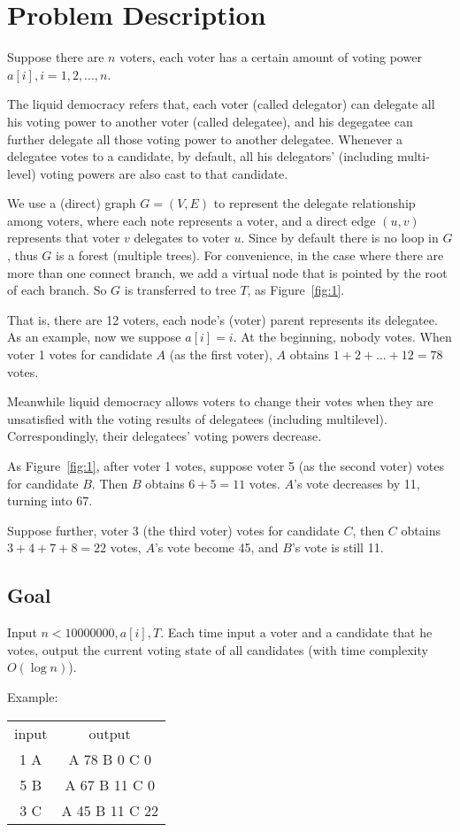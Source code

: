 \section{Problem Description}
Suppose there are $n$ voters, each voter has a certain amount of voting power $a[i],i=1,2,...,n$.

The liquid democracy refers that, each voter (called delegator) can delegate all his voting power to another voter (called delegatee), and his degegatee can further delegate all those voting power to another delegatee. Whenever a delegatee votes to a candidate, by default, all his delegators' (including multi-level) voting powers are also cast to that candidate.

We use a (direct) graph $G=(V,E)$ to represent the delegate relationship among
voters, where each note represents a voter, and a direct edge $(u,v)$
represents that voter $v$ delegates to voter $u$. Since by default there is no
loop in $G$, thus $G$ is a forest (multiple trees). For convenience, in the
case where there are more than one connect branch, we add a virtual node that
is pointed by the root of each branch. So $G$ is transferred to tree $T$, as
Figure~\ref{fig:1}.

That is, there are 12 voters, each node's  (voter) parent represents its
delegatee. As an example, now we  suppose $a[i]=i$. At the beginning, nobody
votes. When voter 1 votes for candidate $A$ (as the first voter), $A$ obtains
$1+2+...+12=78$ votes.

Meanwhile liquid democracy allows voters to change their votes when they are unsatisfied with the voting results of delegatees (including multilevel). Correspondingly, their delegatees' voting powers decrease.

As Figure~\ref{fig:1}, after voter 1 votes, suppose voter 5 (as the second
voter) votes for candidate $B$. Then $B$ obtains $6+5=11$ votes. $A$'s vote
decreases by 11, turning into 67.

Suppose further, voter 3 (the third voter) votes for candidate $C$, then $C$
obtains $3+4+7+8=22$ votes, $A$'s  vote become 45, and $B$'s vote is still 11.

\begin{figure*}
  \centering
	\label{fig:1}
  
	\caption{Tree $T$. We ignore the virtual node with index 0 here.}
\end{figure*}
\subsection{Goal}
Input $n<10000000,a[i],T$. Each time input a voter and a candidate that he votes, output the current voting state of all candidates (with time complexity $O(\log n)$).

Example:

\begin{tabular}{|c|c|}
input & output \\
1 A			&		A 78 B 0 C 0
\\
5 B			&		A 67 B 11 C 0
\\
3 C			&		A 45 B 11 C 22
\end{tabular}


